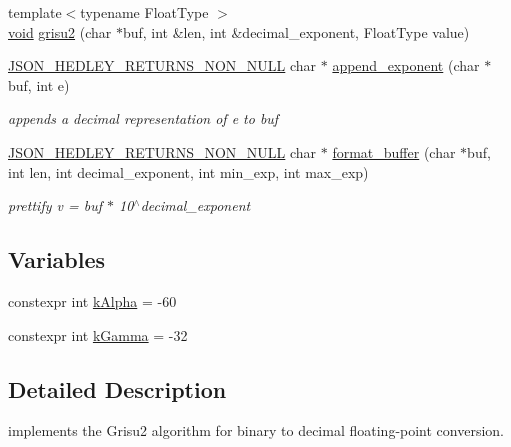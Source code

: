 \begin{DoxyCompactItemize}
\item 
{\footnotesize template$<$typename Float\+Type $>$ }\\\hyperlink{namespacenlohmann_1_1detail_a59fca69799f6b9e366710cb9043aa77d}{void} \hyperlink{namespacenlohmann_1_1detail_1_1dtoa__impl_aab7a9670a4f4704a5d0347ad7588576b}{grisu2} (char $\ast$buf, int \&len, int \&decimal\+\_\+exponent, Float\+Type value)
\item 
\hyperlink{json_8hpp_a5f2aaec3b681d0a72f7d6e90b70cdcd1}{J\+S\+O\+N\+\_\+\+H\+E\+D\+L\+E\+Y\+\_\+\+R\+E\+T\+U\+R\+N\+S\+\_\+\+N\+O\+N\+\_\+\+N\+U\+LL} char $\ast$ \hyperlink{namespacenlohmann_1_1detail_1_1dtoa__impl_ad90f19ed10d8133b727df4b9bc5ddf5c}{append\+\_\+exponent} (char $\ast$buf, int e)
\begin{DoxyCompactList}\small\item\em appends a decimal representation of e to buf \end{DoxyCompactList}\item 
\hyperlink{json_8hpp_a5f2aaec3b681d0a72f7d6e90b70cdcd1}{J\+S\+O\+N\+\_\+\+H\+E\+D\+L\+E\+Y\+\_\+\+R\+E\+T\+U\+R\+N\+S\+\_\+\+N\+O\+N\+\_\+\+N\+U\+LL} char $\ast$ \hyperlink{namespacenlohmann_1_1detail_1_1dtoa__impl_ab441f2761e33839ca48bc2225e14a2a9}{format\+\_\+buffer} (char $\ast$buf, int len, int decimal\+\_\+exponent, int min\+\_\+exp, int max\+\_\+exp)
\begin{DoxyCompactList}\small\item\em prettify v = buf $\ast$ 10$^\wedge$decimal\+\_\+exponent \end{DoxyCompactList}\end{DoxyCompactItemize}
\subsection*{Variables}
\begin{DoxyCompactItemize}
\item 
constexpr int \hyperlink{namespacenlohmann_1_1detail_1_1dtoa__impl_ac1ea1316de0b4a219f707c76b1db1966}{k\+Alpha} = -\/60
\item 
constexpr int \hyperlink{namespacenlohmann_1_1detail_1_1dtoa__impl_a4a750fcc38da1ce68b7e25ab3a230e20}{k\+Gamma} = -\/32
\end{DoxyCompactItemize}


\subsection{Detailed Description}
implements the Grisu2 algorithm for binary to decimal floating-\/point conversion. 

